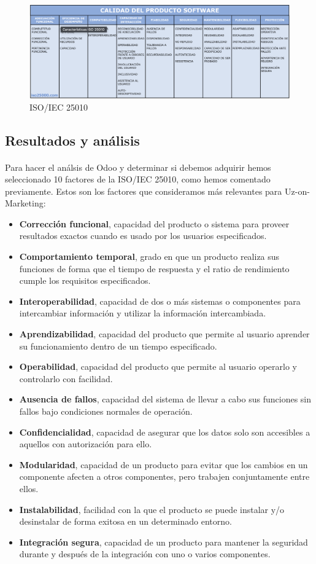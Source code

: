 \begin{figure}
    \centering
    \includegraphics[width=1\linewidth]{final/iso.png}
    \caption{ISO/IEC 25010}
    \label{fig:enter-label}
\end{figure}

\subsection{Resultados y análisis}
\paragraph{}
Para hacer el análsis de Odoo y determinar si debemos adquirir hemos seleccionado 10 factores de la ISO/IEC 25010, como hemos comentado previamente.
Estos son los factores que consideramos más relevantes para Uz-on-Marketing:
\begin{itemize}
    \item \textbf{Corrección funcional}, capacidad del producto o sistema para proveer resultados exactos cuando es usado por los usuarios especificados.
    \item \textbf{Comportamiento temporal}, grado en que un producto realiza sus funciones de forma que el tiempo de respuesta y el ratio de rendimiento cumple los requisitos especificados.
    \item \textbf{Interoperabilidad}, capacidad de dos o más sistemas o componentes para intercambiar información y utilizar la información intercambiada.
    \item \textbf{Aprendizabilidad}, capacidad del producto que permite al usuario aprender su funcionamiento dentro de un tiempo especificado.
    \item \textbf{Operabilidad}, capacidad del producto que permite al usuario operarlo y controlarlo con facilidad.
    \item \textbf{Ausencia de fallos}, capacidad del sistema de llevar a cabo sus funciones sin fallos bajo condiciones normales de operación.
    \item \textbf{Confidencialidad}, capacidad de asegurar que los datos solo son accesibles a aquellos con autorización para ello.
    \item \textbf{Modularidad}, capacidad de un producto para evitar que los cambios en un componente afecten a otros componentes, pero trabajen conjuntamente entre ellos.
    \item \textbf{Instalabilidad}, facilidad con la que el producto se puede instalar y/o desinstalar de forma exitosa en un determinado entorno.
    \item \textbf{Integración segura}, capacidad de un producto para mantener la seguridad durante y después de la integración con uno o varios componentes.
\end{itemize}

